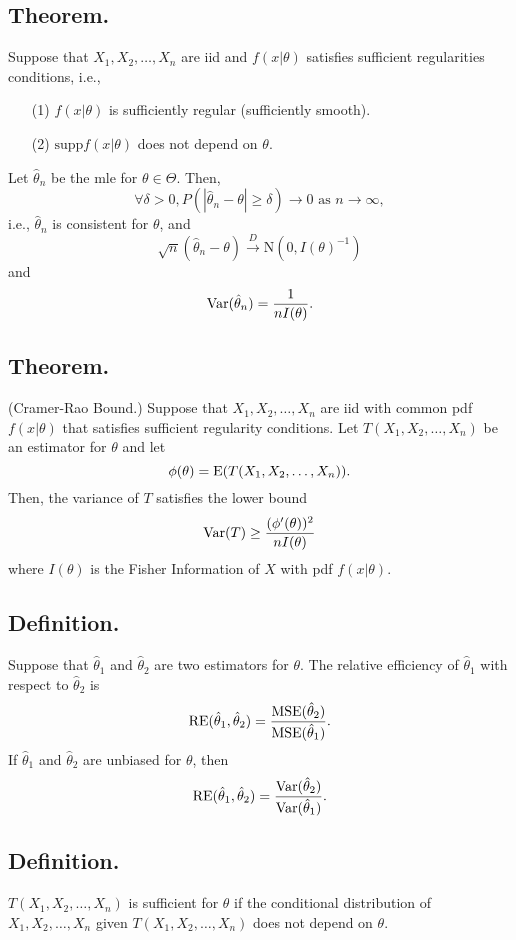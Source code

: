 \documentclass[titlepage]{article}
\begin{document}
\subsection{Theorem.} Suppose that $X_{1}, X_{2}, \ldots, X_{n}$ are iid and $f(x|\theta)$ satisfies sufficient regularities conditions, i.e., 
\begin{enumerate}
\item[(1)] $f(x|\theta)$ is sufficiently regular (sufficiently smooth).
\item[(2)] $\text{supp} f(x|\theta)$ does not depend on $\theta$.
\end{enumerate}
Let $\hat{\theta}_{n}$ be the mle for $\theta \in \Theta$. Then, 
$$\forall \delta > 0, P(|\hat{\theta}_{n} - \theta| \geq \delta) \to 0 \text{ as } n \to \infty,$$
i.e., $\hat{\theta}_{n}$ is consistent for $\theta$, and 
$$\sqrt{n}(\hat{\theta}_{n} - \theta) \xrightarrow{D} \text{N}(0, I(\theta)^{-1})$$
and 
$$\text{Var}(\hat{\theta}_{n}) = \frac{1}{nI(\theta)}.$$

\subsection{Theorem.} (Cramer-Rao Bound.) Suppose that $X_{1}, X_{2}, \ldots, X_{n}$ are iid with common pdf $f(x|\theta)$ that satisfies sufficient regularity conditions. Let $T(X_{1}, X_{2}, \ldots, X_{n})$ be an estimator for $\theta$ and let 
$$\phi(\theta) = \text{E}(T(X_{1}, X_{2}, \ldots, X_{n})).$$
Then, the variance of $T$ satisfies the lower bound 
$$\text{Var}(T) \geq \frac{(\phi'(\theta))^{2}}{nI(\theta)}$$
where $I(\theta)$ is the Fisher Information of $X$ with pdf $f(x|\theta)$.

\subsection{Definition.} Suppose that $\hat{\theta}_{1}$ and $\hat{\theta}_{2}$ are two estimators for $\theta$. The relative efficiency of $\hat{\theta}_{1}$ with respect to $\hat{\theta}_{2}$ is
$$\text{RE}(\hat{\theta}_{1}, \hat{\theta}_{2}) = \frac{\text{MSE}(\hat{\theta}_{2})}{\text{MSE}(\hat{\theta}_{1})}.$$
If $\hat{\theta}_{1}$ and $\hat{\theta}_{2}$ are unbiased for $\theta$, then 
$$\text{RE}(\hat{\theta}_{1}, \hat{\theta}_{2}) = \frac{\text{Var}(\hat{\theta}_{2})}{\text{Var}(\hat{\theta}_{1})}.$$

\subsection{Definition.} $T(X_{1}, X_{2}, \ldots, X_{n})$ is sufficient for $\theta$ if the conditional distribution of $X_{1}, X_{2}, \ldots, X_{n}$ given $T(X_{1}, X_{2}, \ldots, X_{n})$ does not depend on $\theta$.
\end{document}
